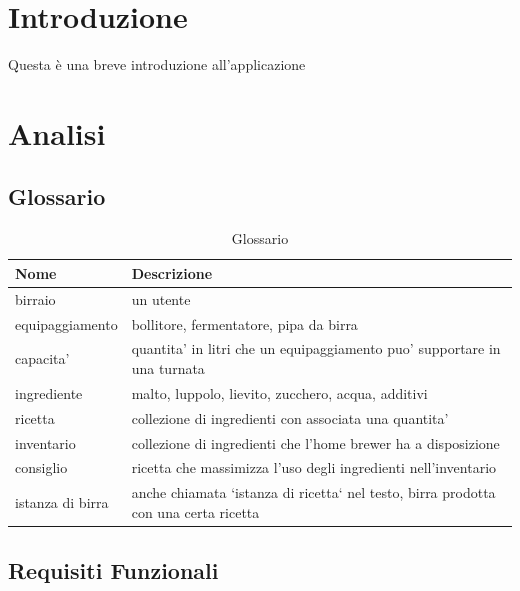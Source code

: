 \documentclass[a4paper,12pt]{report}
\begin{document}
    \newpage
   \tableofcontents
   
   \newpage
    
    
    \chapter{Introduzione}
	Questa è una breve introduzione all'applicazione
	
    \chapter{Analisi}
    	\section{Glossario}
    		\begin{table}[!h]
      			\renewcommand{\arraystretch}{1.2}
      			\begin{tabular}{p{}|p{}} 
        				\textbf{Nome}  & \textbf{Descrizione} \\
    				\hline
           			birraio & un utente \\
                        		equipaggiamento & bollitore, fermentatore, pipa da birra \\
                            	capacita' & quantita' in litri che un equipaggiamento puo' supportare in una turnata \\
                          	ingrediente & malto, luppolo, lievito, zucchero, acqua, additivi \\
                          	ricetta & collezione di ingredienti con associata una quantita' \\
                          	inventario & collezione di ingredienti che l'home brewer ha a disposizione \\
                            	consiglio & ricetta che massimizza l'uso degli ingredienti nell'inventario \\
                            	istanza di birra & anche chiamata `istanza di ricetta` nel testo, birra prodotta con una certa ricetta \\
        			\end{tabular}
        			\caption{Glossario}
      			\label{tab:Gloassario}
    		\end{table}
	
    \newpage
	\section{Requisiti Funzionali}
	
\end{document}
